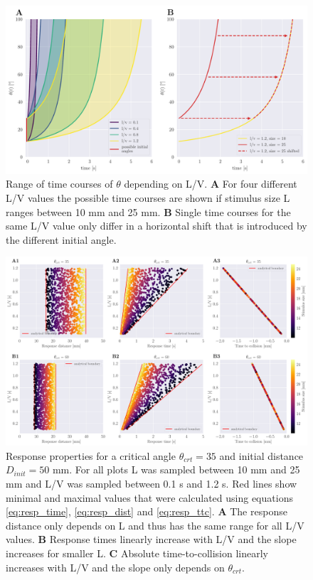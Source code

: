     \begin{figure}[H]
    	\begin{center}
			\includegraphics[width=\textwidth]{figure_theta_lv_test.pdf}
    	\end{center}
    	\caption{Range of time courses of $\theta$ depending on L/V. \textbf{A} For four different L/V values the possible time courses are shown if stimulus size L ranges between 10 mm and 25 mm. \textbf{B} Single time courses for the same L/V value only differ in a horizontal shift that is introduced by the different initial angle.}
    	\label{fig:theta_lv}
    \end{figure}
    
    \begin{figure}[H]
    	\begin{center}
			\includegraphics[width=\textwidth]{figure_ideal_resp_v2.pdf}
    	\end{center}
    	\caption{Response properties for a critical angle $\theta_{crt}=35$ and initial distance $D_{init}=50$ mm.  For all plots L was sampled between 10 mm and 25 mm and L/V was sampled between 0.1 s and 1.2 s. Red lines show minimal and maximal values that were calculated using equations \ref{eq:resp_time}, \ref{eq:resp_dist} and \ref{eq:resp_ttc}. \textbf{A} The response distance only depends on L and thus has the same range for all L/V values. \textbf{B} Response times linearly increase with L/V and the slope increases for smaller L. \textbf{C} Absolute time-to-collision linearly increases with L/V and the slope only depends on $\theta_{crt}$.}
    	\label{fig:ideal_resp_props}
    \end{figure}
		
